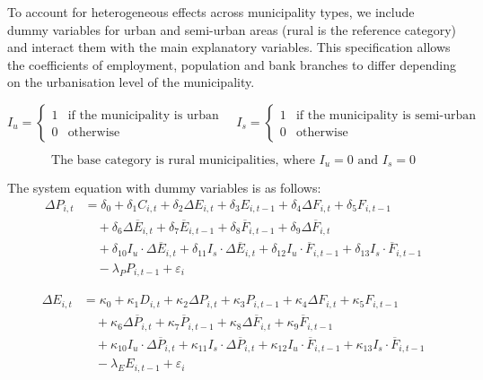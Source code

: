 \documentclass[a4paper,11pt,oneside]{article}
\begin{document}
To account for heterogeneous effects across municipality types, we include dummy variables for urban and semi-urban areas (rural is the reference category) and interact them with the main explanatory variables. This specification allows the coefficients of employment, population and bank branches to differ depending on the urbanisation level of the municipality.


\[
I_{u} =
\begin{cases}
1 & \text{if the municipality is urban} \\
0 & \text{otherwise}
\end{cases}
\quad
I_{s} =
\begin{cases}
1 & \text{if the municipality is semi-urban} \\
0 & \text{otherwise}
\end{cases}
\]

\[
\text{The base category is rural municipalities, where } I_u = 0 \text{ and } I_s = 0
\]


The system equation with dummy variables is as follows:
%
\begin{equation}
\label{eq:pop}
\begin{aligned}
\Delta P_{i,t} &= \delta_0 + \delta_1 C_{i,t} + \delta_2 \Delta E_{i,t} + \delta_3 E_{i,t-1} + \delta_4 \Delta F_{i,t} + \delta_5 F_{i,t-1} \\
&\quad + \delta_6 \Delta \overline{E}_{i,t} + \delta_7 \overline{E}_{i,t-1} + \delta_8 \overline{F}_{i,t-1} + \delta_9 \Delta \overline{F}_{i,t} \\
&\quad + \delta_{10} I_u \cdot \Delta \overline{E}_{i,t} + \delta_{11} I_s \cdot \Delta \overline{E}_{i,t} + \delta_{12} I_u \cdot \overline{F}_{i,t-1} + \delta_{13} I_s \cdot \overline{F}_{i,t-1} \\
&\quad - \lambda_P P_{i,t-1} + \varepsilon_{i}
\end{aligned}
\end{equation}

\begin{equation}
\label{eq:emp}
\begin{aligned}
\Delta E_{i,t} &= \kappa_0 + \kappa_1 D_{i,t} + \kappa_2 \Delta P_{i,t} + \kappa_3 P_{i,t-1} + \kappa_4 \Delta F_{i,t} + \kappa_5 F_{i,t-1} \\
&\quad + \kappa_6 \Delta \overline{P}_{i,t} + \kappa_7 \overline{P}_{i,t-1} + \kappa_8 \Delta \overline{F}_{i,t} + \kappa_9 \overline{F}_{i,t-1} \\
&\quad + \kappa_{10} I_u \cdot \Delta \overline{P}_{i,t} + \kappa_{11} I_s \cdot \Delta \overline{P}_{i,t} + \kappa_{12} I_u \cdot \overline{F}_{i,t-1} + \kappa_{13} I_s \cdot \overline{F}_{i,t-1} \\
&\quad - \lambda_E E_{i,t-1} + \varepsilon_{i}
\end{aligned}
\end{equation}
\end{document}

